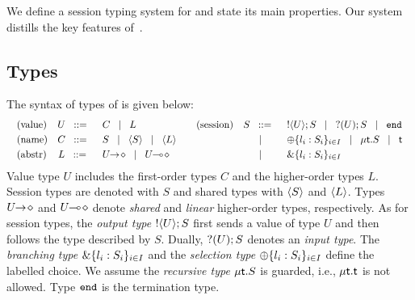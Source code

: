 \noi %
We define a session typing system for \HOp and state its main properties. 
Our system distills the key features of~\cite{tlca07,MostrousY15}.



\subsection{Types}
The syntax of types of \HOp is given below:
\[
	\begin{array}{cc}
		\begin{array}{lcl}
			\textrm{(value)} & U \;\;::=\;\; & C \;\;\;|\;\;\; L
			\\[1mm]
			\textrm{(name)} & C \;\;::=\;\; & S \;\;\;|\;\;\; \langle S \rangle \;\;\;|\;\;\; \langle L \rangle
			\\[1mm]
			\textrm{(abstr)} & L \;\;::=\;\; & U\!\! \rightarrow\! \diamond \;\;\;|\;\;\; U\!\! \multimap\! \diamond
		\end{array}
		&
		\begin{array}{lcl}
			\textrm{(session)} & S \;\;::=\;\; &  ! \langle U \rangle ; S \;\;\;|\;\;\; ? (U) ; S \;\;\;|\;\;\; \mathtt{end}
			\\[1mm]
			&\;\;\;|\;\;\;& \oplus \{l_i:S_i\}_{i \in I} \;\;\;|\;\;\; \mu\mathsf{t}.S \;\;\;|\;\;\; \mathsf{t}
			\\[1mm]
			&\;\;\;|\;\;\;& \& \{l_i:S_i\}_{i \in I}
		\end{array}
	\end{array}
	\]
Value type $U$ includes
the first-order types $C$ and the higher-order
types $L$. Session types are denoted with $S$ and
shared types with $\langle S \rangle$ and $\langle L \rangle$.
Types $U\!\! \rightarrow\! \diamond$ and $U\!\! \multimap\! \diamond$ denote
{\em shared} and {\em linear} higher-order 
types, respectively.
As for session types,  
the {\em output type}
$! \langle U \rangle ; S$ %
first sends a value of
type $U$ and then follows the type described by $S$.  Dually,
$? (U) ; S$ denotes an {\em input type}. The {\em branching type}
$\& \{l_i:S_i\}_{i \in I}$ and the {\em selection type}
$\oplus \{l_i:S_i\}_{i \in I}$ define the labelled choice. 
We assume the {\em recursive type} $\mu\mathsf{t}.S$ is guarded,
i.e.,  $\mu\mathsf{t}.\mathsf{t}$ is not allowed. 
Type $\mathtt{end}$ is the termination type. 

